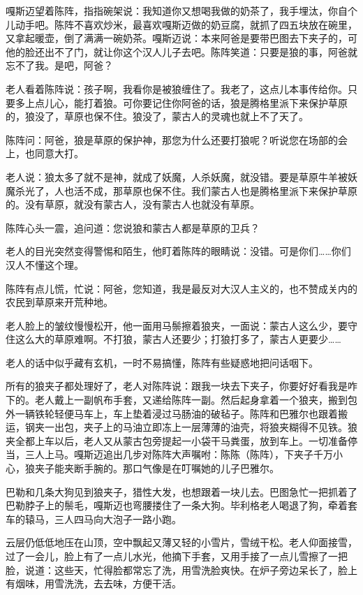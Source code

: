 \par 嘎斯迈望着陈阵，指指碗架说：我知道你又想喝我做的奶茶了，我手埋汰，你自个儿动手吧。陈阵不喜欢炒米，最喜欢嘎斯迈做的奶豆腐，就抓了四五块放在碗里，又拿起暖壶，倒了满满一碗奶茶。嘎斯迈说：本来阿爸是要带巴图去下夹子的，可他的脸还出不了门，就让你这个汉人儿子去吧。陈阵笑道：只要是狼的事，阿爸就忘不了我。是吧，阿爸？
\par 老人看着陈阵说：孩子啊，我看你是被狼缠住了。我老了，这点儿本事传给你。只要多上点儿心，能打着狼。可你要记住你阿爸的话，狼是腾格里派下来保护草原的，狼没了，草原也保不住。狼没了，蒙古人的灵魂也就上不了天了。
\par 陈阵问：阿爸，狼是草原的保护神，那您为什么还要打狼呢？听说您在场部的会上，也同意大打。
\par 老人说：狼太多了就不是神，就成了妖魔，人杀妖魔，就没错。要是草原牛羊被妖魔杀光了，人也活不成，那草原也保不住。我们蒙古人也是腾格里派下来保护草原的。没有草原，就没有蒙古人，没有蒙古人也就没有草原。
\par 陈阵心头一震，追问道：您说狼和蒙古人都是草原的卫兵？
\par 老人的目光突然变得警惕和陌生，他盯着陈阵的眼睛说：没错。可是你们……你们汉人不懂这个理。
\par 陈阵有点儿慌，忙说：阿爸，您知道，我是最反对大汉人主义的，也不赞成关内的农民到草原来开荒种地。
\par 老人脸上的皱纹慢慢松开，他一面用马鬃擦着狼夹，一面说：蒙古人这么少，要守住这么大的草原难啊。不打狼，蒙古人还要少；打狼打多了，蒙古人更要少……
\par 老人的话中似乎藏有玄机，一时不易搞懂，陈阵有些疑惑地把问话咽下。
\par 所有的狼夹子都处理好了，老人对陈阵说：跟我一块去下夹子，你要好好看我是咋下的。老人戴上一副帆布手套，又递给陈阵一副。然后起身拿着一个狼夹，搬到包外一辆铁轮轻便马车上，车上垫着浸过马肠油的破毡子。陈阵和巴雅尔也跟着搬运，钢夹一出包，夹子上的马油立即冻上一层薄薄的油壳，将狼夹糊得不见铁。狼夹全都上车以后，老人又从蒙古包旁提起一小袋干马粪蛋，放到车上。一切准备停当，三人上马。嘎斯迈追出几步对陈阵大声嘱咐：陈陈（陈阵），下夹子千万小心，狼夹子能夹断手腕的。那口气像是在叮嘱她的儿子巴雅尔。
\par 巴勒和几条大狗见到狼夹子，猎性大发，也想跟着一块儿去。巴图急忙一把抓着了巴勒脖子上的鬃毛，嘎斯迈也弯腰搂住了一条大狗。毕利格老人喝退了狗，牵着套车的辕马，三人四马向大泡子一路小跑。
\par 云层仍低低地压在山顶，空中飘起又薄又轻的小雪片，雪绒干松。老人仰面接雪，过了一会儿，脸上有了一点儿水光，他摘下手套，又用手接了一点儿雪擦了一把脸，说道：这些天，忙得脸都常忘了洗，用雪洗脸爽快。在炉子旁边呆长了，脸上有烟味，用雪洗洗，去去味，方便干活。
